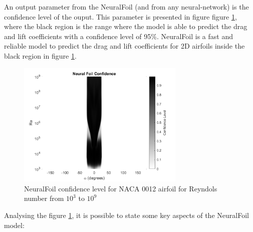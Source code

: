An output parameter from the NeuralFoil (and from any neural-network) is the confidence level of the ouput. This parameter is presented in figure figure \ref{fig:neuralfoil_confidence}, where the black region is the range where the model is able to predict the drag and lift coefficients with a confidence level of 95\%. NeuralFoil \cite{sharpe_neuralfoil_nodate} is a fast and reliable model to predict the drag and lift coefficients for 2D airfoils inside the black region in figure \ref{fig:neuralfoil_confidence}.

\begin{figure}[!htb]
    \centering
    \includegraphics[width=8cm]{Figures/background/aero/NeuralFoil_Confidence_2D_black.png}
    \caption{NeuralFoil confidence level for NACA 0012 airfoil for Reyndols number from $10^3$ to $10^9$}
    \label{fig:neuralfoil_confidence}
\end{figure}

Analysing the figure \ref{fig:neuralfoil_confidence}, it is possible to state some key aspects of the NeuralFoil model:

